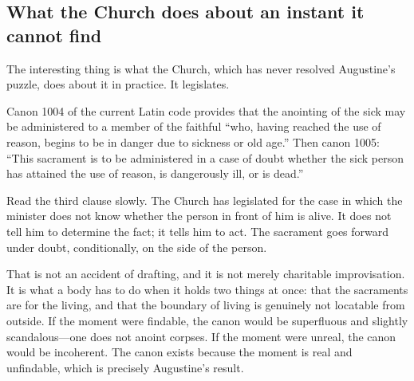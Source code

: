 \subsection{What the Church does about an instant it cannot find}

The interesting thing is what the Church, which has never resolved Augustine's puzzle, does about it in practice. It legislates.

Canon 1004 of the current Latin code provides that the anointing of the sick may be administered to a member of the faithful ``who, having reached the use of reason, begins to be in danger due to sickness or old age.'' Then canon 1005: ``This sacrament is to be administered in a case of doubt whether the sick person has attained the use of reason, is dangerously ill, or is dead.''

Read the third clause slowly. The Church has legislated for the case in which the minister does not know whether the person in front of him is alive. It does not tell him to determine the fact; it tells him to act. The sacrament goes forward under doubt, conditionally, on the side of the person.

That is not an accident of drafting, and it is not merely charitable improvisation. It is what a body has to do when it holds two things at once: that the sacraments are for the living, and that the boundary of living is genuinely not locatable from outside. If the moment were findable, the canon would be superfluous and slightly scandalous---one does not anoint corpses. If the moment were unreal, the canon would be incoherent. The canon exists because the moment is real and unfindable, which is precisely Augustine's result.

